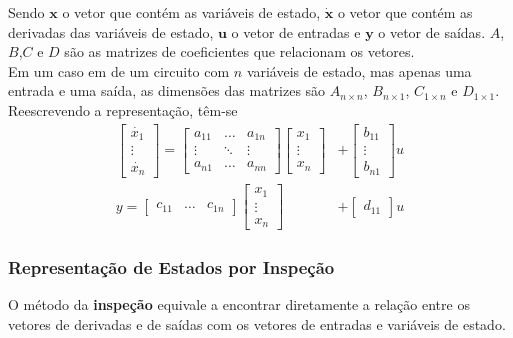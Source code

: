 \documentclass{article}
\numberwithin{equation}{section}
\begin{document}
Sendo $\textbf{x}$ o vetor que contém as variáveis de estado, $\dot{\textbf{x}}$ o vetor que contém as derivadas das variáveis de estado, $\textbf{u}$ o vetor de entradas e $\textbf{y}$ o vetor de saídas. $A$,$B$,$C$ e $D$ são as matrizes de coeficientes que relacionam os vetores. \\
Em um caso em de um circuito com $n$ variáveis de estado, mas apenas uma entrada e uma saída, as dimensões das matrizes são
$A_{n\times n}$, $B_{n\times 1}$, $C_{1\times n}$ e $D_{1\times 1}$. Reescrevendo a representação, têm-se
\begin{eqnarray}
    \begin{bmatrix}
        \dot{x_{1}}  \\
        \vdots \\
        \dot{x_{n}}
    \end{bmatrix}
    = %
    \begin{bmatrix}
        a_{11} & \dots & a_{1n}\\
        \vdots & \ddots& \vdots\\
        a_{n1} & \dots & a_{nn}
    \end{bmatrix}
    \begin{bmatrix}
        x_{1} \\
        \vdots\\
        x_{n}
    \end{bmatrix} &+ %
    \begin{bmatrix}
        b_{11}\\
        \vdots\\
        b_{n1}
    \end{bmatrix}
    u
\\
    y =
    \begin{bmatrix}
        c_{11} & \dots & c_{1n}
    \end{bmatrix}
    \begin{bmatrix}
        x_{1} \\
        \vdots\\
        x_{n}
    \end{bmatrix} &+ %
    \begin{bmatrix}
        d_{11}
    \end{bmatrix}
    u
\end{eqnarray}
\subsubsection{Representação de Estados por Inspeção}
\label{subsubsec:est_inspeção}
O método da \textbf{inspeção} equivale a encontrar diretamente a relação entre os vetores de derivadas e de saídas com os vetores de entradas e variáveis de estado.
\end{document}
